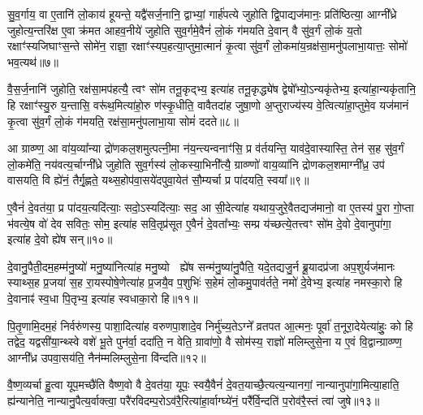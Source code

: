 {\anuvakamend[{स्तु॒ते वि॒न्दते॒ हि वी॑यन्ते प्र॒तीची॑रुद्गा॒त्र उ॒प्यन्ते॒ चतु॑र्दश च}]}%

सु॒व॒र्गाय॒ वा ए॒तानि॑ लो॒काय॑ हूयन्ते॒ यद्वै॑सर्ज॒नानि॒ द्वाभ्यां॒ गार्\mbox{}ह॑पत्ये जुहोति द्वि॒पाद्यज॑मानः॒ प्रति॑ष्ठित्या॒ आग्नी᳚ध्रे जुहोत्य॒न्तरि॑क्ष ए॒वा क्र॑मत आहव॒नीये॑ जुहोति सुव॒र्गमे॒वैनं॑ लो॒कं ग॑मयति दे॒वान् वै सु॑व॒र्गं लो॒कं य॒तो रक्षाꣳ॑स्यजिघाꣳस॒न्ते सोमे॑न॒ राज्ञा॒ रक्षाꣳ॑स्यप॒हत्या॒प्तुमा॒त्मानं॑ कृ॒त्वा सु॑व॒र्गं लो॒कमा॑य॒न्रक्ष॑सा॒मनु॑पलाभा॒यात्तः॒ सोमो॑ भव॒त्यथ॑॥७॥

वै॒स॒र्ज॒नानि॑ जुहोति॒ रक्ष॑सा॒मप॑हत्यै॒ त्वꣳ सो॑म तनू॒कृद्भ्य॒ इत्या॑ह तनू॒कृद्ध्ये॑ष द्वेषो᳚भ्यो॒\-ऽन्यकृ॑तेभ्य॒ इत्या॑हा॒न्यकृ॑तानि॒ हि रक्षाꣳ॑स्यु॒रु य॒न्तासि॒ वरू॑थ॒मित्या॑हो॒रु ण॑स्कृ॒धीति॒ वावैतदा॑ह जुषा॒णो अ॒प्तुराज्य॑स्य वे॒त्वित्या॑हा॒प्तुमे॒व यज॑मानं कृ॒त्वा सु॑व॒र्गं लो॒कं ग॑मयति॒ रक्ष॑सा॒मनु॑पलाभा॒या सोमं॑ ददते॥८॥

आ ग्राव्ण्ण॒ आ वा॑य॒व्या᳚न्या द्रो॑णकल॒शमुत्पत्नी॒मा न॑य॒न्त्यन्वनाꣳ॑सि॒ प्र व॑र्तयन्ति॒ याव॑दे॒वास्यास्ति॒ तेन॑ स॒ह सु॑व॒र्गं लो॒कमे॑ति॒ नय॑वत्य॒र्चाग्नी᳚ध्रे जुहोति सुव॒र्गस्य॑ लो॒कस्या॒भिनी᳚त्यै॒ ग्राव्ण्णो॑ वाय॒व्या॑नि द्रोणकल॒शमाग्नी᳚ध्र॒ उप॑ वासयति॒ वि ह्ये॑नं॒ तैर्गृ॒ह्णते॒ यथ्स॒होप॑वा॒सये॑दपुवा॒येत॑ सौ॒म्यर्चा प्र पा॑दयति॒ स्वया᳚॥९॥

ए॒वैनं॑ दे॒वत॑या॒ प्र पा॑दय॒त्यदि॑त्याः॒ सदो॒\-ऽस्यदि॑त्याः॒ सद॒ आ सी॒देत्या॑ह यथाय॒जुरे॒वैतद्यज॑मानो॒ वा ए॒तस्य॑ पु॒रा गो॒प्ता भ॑वत्ये॒ष वो॑ देव सवितः॒ सोम॒ इत्या॑ह सवि॒तृप्र॑सूत ए॒वैनं॑ दे॒वता᳚भ्यः॒ सम्प्र य॑च्छत्ये॒तत्त्वꣳ सो॑म दे॒वो दे॒वानुपा॑गा॒ इत्या॑ह दे॒वो ह्ये॑ष सन्॥१०॥

दे॒वानु॒पैती॒दम॒हम्म॑नु॒ष्यो॑ मनु॒ष्या॑नित्या॑ह मनु॒ष्यो  ह्ये॑ष सन्म॑नु॒ष्या॑नु॒पैति॒ यदे॒तद्यजु॒र्न ब्रू॒यादप्र॑जा अप॒शुर्यज॑मानः स्याथ्स॒ह प्र॒जया॑ स॒ह रा॒यस्पोषे॒णेत्या॑ह प्र॒जयै॒व प॒शुभिः॑ स॒हेमं लो॒कमु॒पाव॑र्तते॒ नमो॑ दे॒वेभ्य॒ इत्या॑ह नमस्का॒रो हि दे॒वानाꣴ॑ स्व॒धा पि॒तृभ्य॒ इत्या॑ह स्वधाका॒रो हि॥११॥

पि॒तृ॒णामि॒दम॒हं निर्वरु॑णस्य॒ पाशा॒दित्या॑ह वरुणपा॒शादे॒व निर्मु॑च्य॒ते\-ऽग्ने᳚ व्रतपत आ॒त्मनः॒ पूर्वा॑ त॒नूरा॒देयेत्या॑हुः॒ को हि तद्वेद॒ यद्वसी॑या॒न्थ्स्वे वशे॑ भू॒ते पुन॑र्वा॒ ददा॑ति॒ न वेति॒ ग्रावा॑णो॒ वै सोम॑स्य॒ राज्ञो॑ मलिम्लुसे॒ना य ए॒वं वि॒द्वान्ग्राव्ण्ण॒ आग्नी᳚ध्र उपवा॒सय॑ति॒ नैन॑म्मलिम्लुसे॒ना वि॑न्दति॥१२॥

{\anuvakamend[{अथ॑ ददते॒ स्वया॒ सन्थ्स्व॑धाका॒रो हि वि॑न्दति}]}%

वै॒ष्ण॒व्यर्चा हु॒त्वा यूप॒मच्छै॑ति वैष्ण॒वो वै दे॒वत॑या॒ यूपः॒ स्वयै॒वैनं॑ दे॒वत॒याच्छै॒त्यत्य॒न्यानगां॒ नान्यानुपा॑गा॒मित्या॒हाति॒ ह्य॑न्यानेति॒ नान्यानु॒पैत्य॒र्वाक्त्वा॒ परै॑रविदम्प॒रो\-ऽव॑रै॒रित्या॑हा॒र्वाग्घ्ये॑नं॒ परै᳚र्वि॒न्दति॑ प॒रोव॑रै॒स्तं त्वा॑ जुषे॥१३॥

